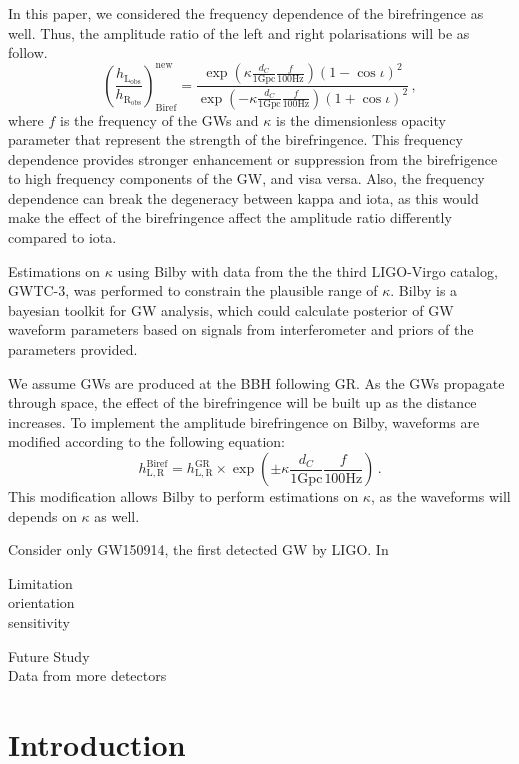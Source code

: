 \documentclass[twocolumn]{aastex631}
\begin{document}
In this paper, we considered the frequency dependence of the birefringence as well. Thus, the amplitude ratio of the left and right polarisations will be as follow.
\begin{equation}
    \left(\frac{h_\mathrm{L_{obs}}}{h_\mathrm{R_{obs}}}\right)_\mathrm{Biref}^\mathrm{new}=\frac{\exp\left({\kappa\frac{d_C}{1\mathrm{ Gpc}}\frac{f}{100\mathrm{ Hz}}}\right)\left(1-\cos\iota\right)^2}{\exp\left({-\kappa\frac{d_C}{1\mathrm{Gpc}}\frac{f}{100\mathrm{Hz}}}\right)\left(1+\cos\iota\right)^2}\,,
\end{equation}where $f$ is the frequency of the GWs and $\kappa$ is the dimensionless opacity parameter that represent the strength of the birefringence.
This frequency dependence provides stronger enhancement or suppression from the birefrigence to high frequency components of the GW, and visa versa.
Also, the frequency dependence can break the degeneracy between kappa and iota, as this would make the effect of the birefringence affect the amplitude ratio differently compared to iota.

Estimations on $\kappa$ using Bilby with data from the the third LIGO-Virgo catalog, GWTC-3, was performed to constrain the plausible range of $\kappa$.
Bilby is a bayesian toolkit for GW analysis, which could calculate posterior of GW waveform parameters based on signals from interferometer and priors of the parameters provided. \citep{Ashton_2019}

We assume GWs are produced at the BBH following GR. As the GWs propagate through space, the effect of the birefringence will be built up as the distance increases.
To implement the amplitude birefringence on Bilby, waveforms are modified according to the following equation:
\begin{equation}
    h_\mathrm{L,R}^{\mathrm{Biref}}=
    h_\mathrm{L,R}^{\mathrm{GR}}\times
    \exp\left(\pm\kappa\frac{d_C}{1\mathrm{ Gpc}}\frac{f}{100\mathrm{ Hz}}\right)\,.
\end{equation}
This modification allows Bilby to perform estimations on $\kappa$, as the waveforms will depends on $\kappa$ as well.

Consider only GW150914, the first detected GW by LIGO. In 

Limitation\\
orientation\\
sensitivity

Future Study\\
Data from more detectors

\section{Introduction}
\end{document}
